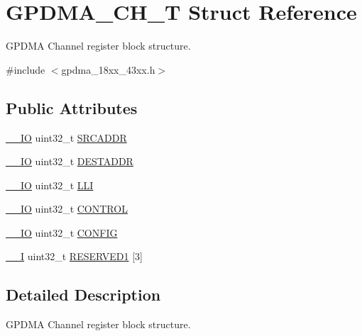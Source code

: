 \hypertarget{struct_g_p_d_m_a___c_h___t}{}\section{G\+P\+D\+M\+A\+\_\+\+C\+H\+\_\+T Struct Reference}
\label{struct_g_p_d_m_a___c_h___t}


G\+P\+D\+MA Channel register block structure.  




{\ttfamily \#include $<$gpdma\+\_\+18xx\+\_\+43xx.\+h$>$}

\subsection*{Public Attributes}
\begin{DoxyCompactItemize}
\item 
\hyperlink{core__sc300_8h_aec43007d9998a0a0e01faede4133d6be}{\+\_\+\+\_\+\+IO} uint32\+\_\+t \hyperlink{struct_g_p_d_m_a___c_h___t_a734e1803144cdaa3cfab1507fa4f05d9}{S\+R\+C\+A\+D\+DR}
\item 
\hyperlink{core__sc300_8h_aec43007d9998a0a0e01faede4133d6be}{\+\_\+\+\_\+\+IO} uint32\+\_\+t \hyperlink{struct_g_p_d_m_a___c_h___t_ab61baba3fc08a7ba4b0502d043ed6ccd}{D\+E\+S\+T\+A\+D\+DR}
\item 
\hyperlink{core__sc300_8h_aec43007d9998a0a0e01faede4133d6be}{\+\_\+\+\_\+\+IO} uint32\+\_\+t \hyperlink{struct_g_p_d_m_a___c_h___t_a240936dbac9f3a949572b3dd196bd83f}{L\+LI}
\item 
\hyperlink{core__sc300_8h_aec43007d9998a0a0e01faede4133d6be}{\+\_\+\+\_\+\+IO} uint32\+\_\+t \hyperlink{struct_g_p_d_m_a___c_h___t_a7b2997d55e2bbe71c2f99d5879ca75c3}{C\+O\+N\+T\+R\+OL}
\item 
\hyperlink{core__sc300_8h_aec43007d9998a0a0e01faede4133d6be}{\+\_\+\+\_\+\+IO} uint32\+\_\+t \hyperlink{struct_g_p_d_m_a___c_h___t_a4f74d11c01d0d3203ceeebd9db2a50a8}{C\+O\+N\+F\+IG}
\item 
\hyperlink{core__sc300_8h_af63697ed9952cc71e1225efe205f6cd3}{\+\_\+\+\_\+I} uint32\+\_\+t \hyperlink{struct_g_p_d_m_a___c_h___t_ae6a0ee831032674d792f9da150e3025e}{R\+E\+S\+E\+R\+V\+E\+D1} \mbox{[}3\mbox{]}
\end{DoxyCompactItemize}


\subsection{Detailed Description}
G\+P\+D\+MA Channel register block structure. 

